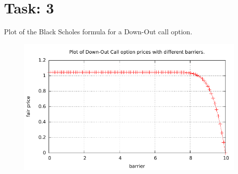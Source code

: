 \documentclass{article}
\begin{document}
\section*{Task: 3}
Plot of the Black Scholes formula for a Down-Out call option.
\begin{figure}[htbp]
  \centering
     \includegraphics[width=1.0\textwidth]{../Task03/sh4_task3_price_plot.pdf}
\end{figure}
\end{document}
